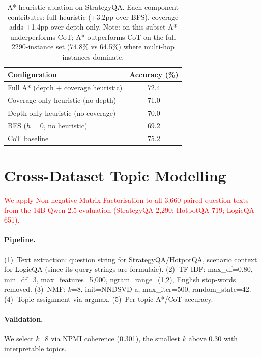 \documentclass[11pt]{article}
\begin{document}
{\begin{table}[ht]
\centering
\small
\begin{tabular}{lc}
\toprule
\textbf{Configuration} & \textbf{Accuracy (\%)} \\
\midrule
Full A* (depth + coverage heuristic) & 72.4 \\
Coverage-only heuristic (no depth) & 71.0 \\
Depth-only heuristic (no coverage) & 70.0 \\
BFS ($h=0$, no heuristic) & 69.2 \\
\midrule
CoT baseline & 75.2 \\
\bottomrule
\end{tabular}
\caption{A* heuristic ablation on StrategyQA. Each component contributes: full heuristic (+3.2pp over BFS), coverage adds +1.4pp over depth-only. Note: on this subset A* underperforms CoT; A* outperforms CoT on the full 2290-instance set (74.8\% vs 64.5\%) where multi-hop instances dominate.}
\label{tab:heuristic_ablation}
\end{table}



\section{Cross-Dataset Topic Modelling}
\label{app:topics}

\textcolor{red}{We apply Non-negative Matrix Factorisation \cite[NMF;][]{lee1999learning} to all 3,660 paired question texts from the 14B Qwen-2.5 evaluation (StrategyQA 2,290; HotpotQA 719; LogicQA 651).}

\paragraph{Pipeline.} (1)~Text extraction: question string for StrategyQA/HotpotQA, scenario context for LogicQA (since its query strings are formulaic). (2)~TF-IDF: max\_df=0.80, min\_df=3, max\_features=5,000, ngram\_range=(1,2), English stop-words removed. (3)~NMF: $k$=8, init=NNDSVD-a, max\_iter=500, random\_state=42. (4)~Topic assignment via argmax. (5)~Per-topic A*/CoT accuracy.

\paragraph{Validation.} We select $k$=8 via NPMI coherence (0.301), the smallest $k$ above 0.30 with interpretable topics.

}
\end{document}
